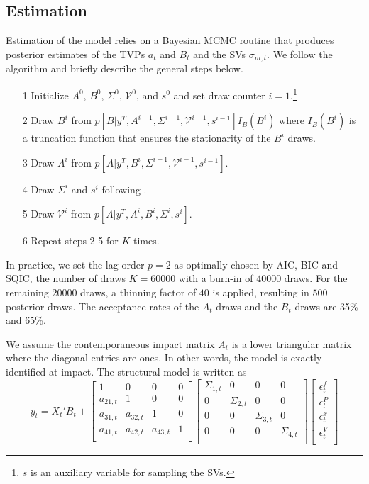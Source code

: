 \documentclass[12pt]{article}
\begin{document}
\subsection{Estimation}
Estimation of the model relies on a Bayesian MCMC routine that produces posterior estimates of the TVPs $a_t$ and $B_t$ and the SVs $\sigma_{m,t}$. We follow the \cite{cfp} algorithm and briefly describe the general steps below. 

\begin{itemize}
	\item[1] Initialize $A^0$, $B^0$, $\Sigma^0$, $\mathcal{V}^0$, and $s^0$ and set draw counter $i=1$.\footnote{$s$ is an auxiliary variable for sampling the SVs.}
	\item[2] Draw $B^i$ from $p[B|y^T, A^{i-1}, \Sigma^{i-1}, \mathcal{V}^{i-1}, s^{i-1}]I_B(B^i)$ where $I_B(B^i)$ is a truncation function that ensures the stationarity of the $B^i$ draws. 
	\item[3] Draw $A^i$ from $p[A|y^T, B^i, \Sigma^{i-1}, \mathcal{V}^{i-1}, s^{i-1}]$. 
	\item[4] Draw $\Sigma^i$ and $s^i$ following \cite{kim}.
	\item[5] Draw $\mathcal{V}^i$ from $p[A|y^T, A^{i}, B^i, \Sigma^{i}, s^{i}]$.
	\item[6] Repeat steps 2-5 for $K$ times.
\end{itemize}

In practice, we set the lag order $p=2$ as optimally chosen by AIC, BIC and SQIC, the number of draws $K = 60000$ with a burn-in of $40000$ draws. For the remaining $20000$ draws, a thinning factor of $40$ is applied, resulting in $500$ posterior draws. The acceptance rates of the $A_t$ draws and the $B_t$ draws are 35\% and 65\%. 

 We assume the contemporaneous impact matrix $A_t$ is a lower triangular matrix where the diagonal entries are ones. In other words, the model is exactly identified at impact. The structural model is written as
 \begin{equation}
 y_t = X_t'B_t +
  \begin{bmatrix}
 1   & 0 & 0 & 0\\
 a_{21,t}   & 1 & 0 & 0 \\
 a_{31,t}   & a_{32,t} & 1 & 0\\
 a_{41,t}   & a_{42,t} & a_{43,t} & 1\\
 \end{bmatrix}
  \begin{bmatrix}
 \Sigma_{1,t} & 0 & 0 & 0\\
 0   & \Sigma_{2,t} & 0 & 0 \\
 0   & 0 & \Sigma_{3,t} & 0\\
 0   & 0 & 0 & \Sigma_{4,t}\\
 \end{bmatrix}
 \begin{bmatrix}
 \epsilon_t^f \\ \epsilon_t^P \\ \epsilon_t^x \\ \epsilon_t^V\\
 \end{bmatrix}
 \end{equation}
 
\end{document}
